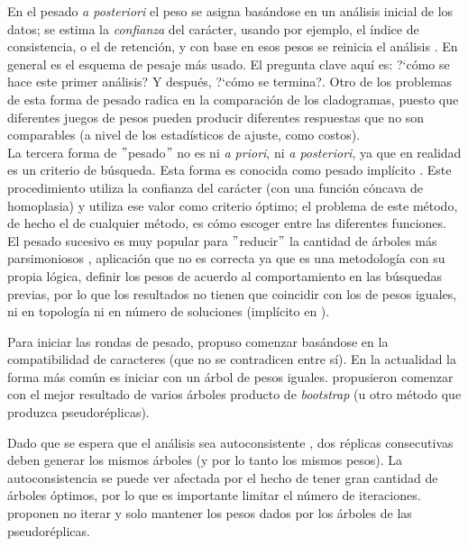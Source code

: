 En el pesado \textit{a posteriori} el peso se asigna bas\'andose en un an\'alisis inicial de los datos; se estima la \textit{confianza} del car\'acter, usando por ejemplo, el \'indice de consistencia, o el de retenci\'on, y con base en esos pesos se reinicia el an\'alisis \citep{Farris1969}. En general es el esquema de pesaje m\'as usado. El pregunta clave aqu\'i es: ?`c\'omo se hace este primer an\'alisis? Y despu\'es, ?`c\'omo se termina?. Otro de los problemas de esta forma de pesado radica en la comparaci\'on de los cladogramas, puesto que diferentes juegos de pesos pueden producir diferentes respuestas que no son comparables (a nivel de los estad\'isticos de ajuste, como costos).\\
La tercera forma de $"$pesado$"$ no es ni \textit{a priori}, ni \textit{a posteriori}, ya que en realidad es un criterio de b\'usqueda. Esta forma es conocida como pesado impl\'icito \citep{Goloboff1993}. Este procedimiento utiliza la confianza del car\'acter (con una funci\'on c\'oncava de homoplasia) y utiliza ese valor como criterio \'optimo; el problema de este m\'etodo, de hecho el de cualquier m\'etodo, es c\'omo escoger entre las diferentes funciones.
El pesado sucesivo es muy popular para $"$reducir$"$ la cantidad de \'arboles m\'as parsimoniosos \citep{Carpenter1988}, aplicaci\'on que no es correcta ya que es una metodolog\'ia con su propia l\'ogica, definir los pesos de acuerdo al comportamiento en las b\'usquedas previas, por lo que los resultados no tienen que coincidir con los de pesos iguales, ni en topolog\'ia ni en n\'umero de soluciones (impl\'icito en \cite{Goloboff1995}).

Para iniciar las rondas de pesado, \cite{Farris1969} propuso comenzar bas\'andose en la compatibilidad de caracteres (que no se contradicen entre s\'i). En la actualidad la forma m\'as com\'un es iniciar con un \'arbol de pesos iguales. \cite{Kjer2001} propusieron comenzar con el mejor resultado de varios \'arboles producto de \textit{bootstrap}
(u otro m\'etodo que produzca pseudor\'eplicas).  

Dado que se espera que el an\'alisis sea autoconsistente  \citep{Farris1969}, dos r\'eplicas consecutivas deben generar  los mismos \'arboles (y por lo tanto los mismos pesos). La autoconsistencia se puede ver afectada por el hecho de tener gran cantidad de \'arboles \'optimos, por lo que es importante limitar el n\'umero de iteraciones. \cite{Kjer2001} proponen no iterar y solo mantener los pesos dados por los \'arboles de las pseudor\'eplicas.

